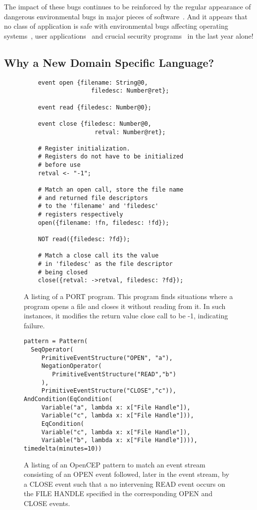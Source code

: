 The impact of these bugs continues to be reinforced by the regular
appearance of dangerous environmental bugs in major pieces of
software~\cite{devzeroroot}.  And it appears that no class of application
is safe with environmental bugs affecting operating
systems~\cite{ubuntuappaport},
user applications~\cite{westerndigitalsymlink} and crucial security
programs~\cite{sudocopy} in the
last year alone!


\subsection{Why a New Domain Specific Language?}
\begin{figure}
  \begin{lstlisting}
    event open {filename: String@0,
                   filedesc: Number@ret};

    event read {filedesc: Number@0};

    event close {filedesc: Number@0,
                    retval: Number@ret};

    # Register initialization.
    # Registers do not have to be initialized
    # before use
    retval <- "-1";

    # Match an open call, store the file name
    # and returned file descriptors
    # to the 'filename' and 'filedesc'
    # registers respectively
    open({filename: !fn, filedesc: !fd});

    NOT read({filedesc: ?fd});

    # Match a close call its the value
    # in 'filedesc' as the file descriptor
    # being closed
    close({retval: ->retval, filedesc: ?fd});

  \end{lstlisting}
  \caption{A listing of a PORT program.  This program finds situations
  where a program opens a file and closes it without reading from it.  In
  such instances, it modifies the return value close call to be -1,
  indicating failure.}
  \label{fig:PORTListing}
\end{figure}

\begin{figure}
  \begin{lstlisting}
pattern = Pattern(
  SeqOperator(
     PrimitiveEventStructure("OPEN", "a"),
     NegationOperator(
        PrimitiveEventStructure("READ","b")
     ),
     PrimitiveEventStructure("CLOSE","c")),
AndCondition(EqCondition(
     Variable("a", lambda x: x["File Handle"]),
     Variable("c", lambda x: x["File Handle"])),
     EqCondition(
     Variable("c", lambda x: x["File Handle"]),
     Variable("b", lambda x: x["File Handle"]))),
timedelta(minutes=10))
  \end{lstlisting}
  \caption{
    A listing of an OpenCEP pattern to match an event stream consisting of an OPEN event followed, later in the event stream, by a CLOSE event such that a no intervening READ event occurs on the FILE HANDLE specified in the corresponding OPEN and CLOSE events.
}
  \label{fig:OpenCEPListing}
\end{figure}


